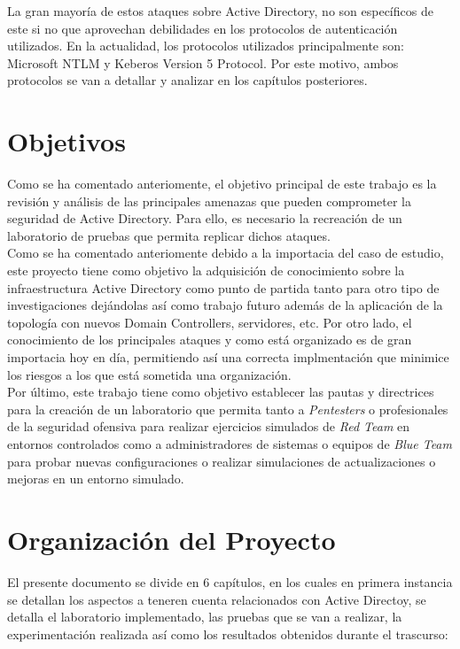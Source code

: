 La gran mayoría de estos ataques sobre Active Directory, no son específicos de este si no que aprovechan debilidades en los protocolos de autenticación utilizados. En la actualidad, los protocolos utilizados principalmente son: Microsoft NTLM y Keberos Version 5 Protocol. Por este motivo, ambos protocolos se van a detallar y analizar en los capítulos posteriores. \\

\section{Objetivos}

Como se ha comentado anteriomente, el objetivo principal de este trabajo es la revisión y análisis de las principales amenazas que pueden comprometer la seguridad de Active Directory. Para ello, es necesario la recreación de un laboratorio de pruebas que permita replicar dichos ataques.\\

Como se ha comentado anteriomente debido a la importacia del caso de estudio, este proyecto tiene como objetivo la adquisición de conocimiento sobre la infraestructura Active Directory como punto de partida tanto para otro tipo de investigaciones dejándolas así como trabajo futuro además de la aplicación de la topología con nuevos Domain Controllers, servidores, etc. Por otro lado, el conocimiento de los principales ataques y como está organizado es de gran importacia hoy en día, permitiendo así una correcta implmentación que minimice los riesgos a los que está sometida una organización. \\

Por último, este trabajo tiene como objetivo establecer las pautas y directrices para la creación de un laboratorio que permita tanto a {\it Pentesters} o profesionales de la seguridad ofensiva para realizar ejercicios simulados de {\it Red Team} en entornos controlados como a administradores de sistemas o equipos de {\it Blue Team} para probar nuevas configuraciones o realizar simulaciones de actualizaciones o mejoras en un entorno simulado. 

\section{Organización del Proyecto}

El presente documento se divide en 6 capítulos, en los cuales en primera instancia se detallan los aspectos a teneren cuenta relacionados con Active Directoy, se detalla el laboratorio implementado, las pruebas que se van a realizar, la experimentación realizada así como los resultados obtenidos durante el trascurso:\\

